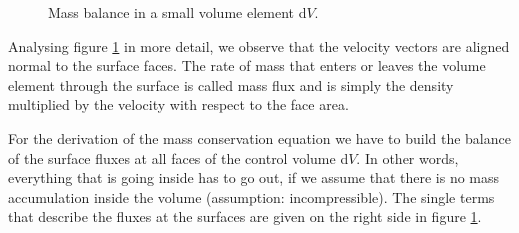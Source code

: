 \documentclass[MathematicsNumericsDerivationsAndOpenFOAM.tex]{subfiles}
\begin{document}
\begin{figure}[!b]
\caption{Mass balance in a small volume element d$V$.}
\label{figure::massFigure}
\end{figure}
%
%
%
%

	Analysing figure \ref{figure::massFigure} in more detail, we observe that
    the velocity vectors are aligned normal to the surface faces. The rate of
    mass that enters or leaves the volume element through the surface is called
    mass flux and is simply the density multiplied by the velocity with respect
    to the face area.

	For the derivation of the mass conservation equation we have to build the
    balance of the surface fluxes at all faces of the control volume d$V$.
    In other words, everything that is going inside has to go out, if we
    assume that there is no mass accumulation inside the volume
    (assumption: incompressible). The single terms that describe the fluxes
    at the surfaces are given on the right side in figure \ref{figure::massFigure}.
\end{document}
